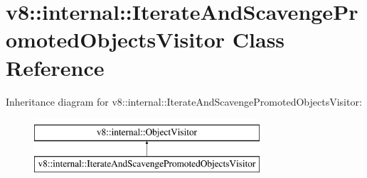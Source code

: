 \hypertarget{classv8_1_1internal_1_1IterateAndScavengePromotedObjectsVisitor}{}\section{v8\+:\+:internal\+:\+:Iterate\+And\+Scavenge\+Promoted\+Objects\+Visitor Class Reference}
\label{classv8_1_1internal_1_1IterateAndScavengePromotedObjectsVisitor}
Inheritance diagram for v8\+:\+:internal\+:\+:Iterate\+And\+Scavenge\+Promoted\+Objects\+Visitor\+:\begin{figure}[H]
\begin{center}
\leavevmode
\includegraphics[height=2.000000cm]{classv8_1_1internal_1_1IterateAndScavengePromotedObjectsVisitor}
\end{center}
\end{figure}
